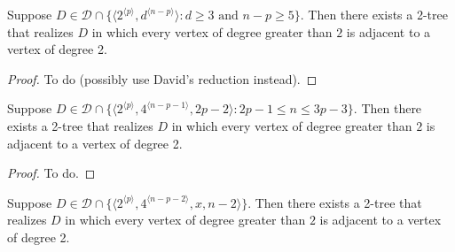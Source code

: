 \documentclass[lotsofwhite,charterfonts]{patmorin}
\newcommand{\rep}[1]{^{\langle#1\rangle}}
\begin{document}
\begin{lem}
Suppose $D\in \mathcal{D}\cap \{\langle 2\rep{p},d\rep{n-p}\rangle:
\mbox{$d\ge 3$ and $n-p \ge 5$}\}$.
Then there exists a 2-tree that realizes $D$ in which every vertex of
degree greater than $2$ is adjacent to a vertex of degree 2.
\end{lem}

\begin{proof}
To do (possibly use David's reduction instead).
\end{proof}


\begin{lem}
Suppose $D\in \mathcal{D}\cap \{\langle 2\rep{p},4\rep{n-p-1},2p-2\rangle:
2p-1\le n\le 3p-3\}$.
Then there exists a 2-tree that realizes $D$ in which every vertex of
degree greater than $2$ is adjacent to a vertex of degree 2.
\end{lem}

\begin{proof}
To do.
\end{proof}

\begin{lem}
Suppose $D\in \mathcal{D}\cap \{\langle 2\rep{p},4\rep{n-p-2},x,n-2\rangle\}$.
Then there exists a 2-tree that realizes $D$ in which every vertex of
degree greater than $2$ is adjacent to a vertex of degree 2.
\end{lem}
\end{document}
